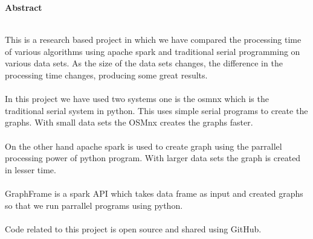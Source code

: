 \begin{center}
{\Huge \bf{Abstract}\vskip 0.2in}
\end{center}
 \hrulefill \\

This is a research based project in which we have compared the processing time of various algorithms using apache spark and traditional serial programming on various data sets. As the size of the data sets changes, the difference in the processing time changes, producing some great results.\\\\
In this project we have used two systems one is the osmnx which is the traditional serial system in python. This uses simple serial programs to create the graphs. With small data sets the OSMnx creates the graphs faster.\\\\
On the other hand apache spark is used to create graph using the parrallel processing power of python program. With larger data sets the graph is created in lesser time.\\\\
GraphFrame is a spark API which takes data frame as input and created graphs so that we run parrallel programs using python.\\\\
Code related to this project is open source and shared using GitHub.


